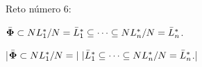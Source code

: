 

\bigskip

\enunciadoS Reto n\'umero 6:

$\bar{\bf\Phi}\subset NL_1^*/N=
\bar L_1^*\subseteq\cdots\subseteq NL_n^*/N=\bar L_n^*$.

\bigskip

\respuestaS

|$\bar{\bf\Phi}\subset NL_1^*/N=|

\ |\bar L_1^*\subseteq\cdots\subseteq NL_n^*/N=\bar L_n^*$.|

\bye

